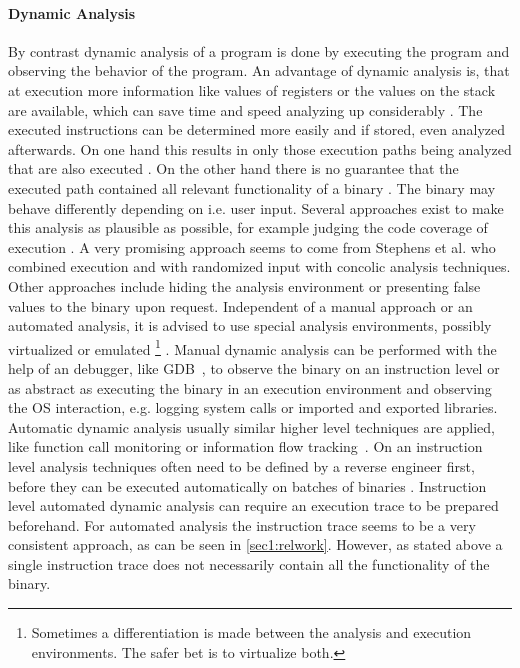 \documentclass[10pt,twoside,a4paper,bibliography=totoc]{scrbook}
\begin{document}
\paragraph*{Dynamic Analysis}
By contrast dynamic analysis of a program is done by executing the program and observing the behavior of the program.
An advantage of dynamic analysis is, that at execution more information 
like values of registers or the values on the stack are available, which
can save time and speed analyzing up considerably \cite{eilam}. 
The executed instructions can be determined more easily and if stored, even analyzed afterwards.
On one hand this results in only those execution paths being analyzed that are also executed \cite{eilam}.
On the other hand there is no guarantee that the executed path contained all relevant functionality of a binary \cite{stephens2016driller}. The binary may behave differently depending on i.e. user input. 
Several approaches exist to make this analysis as plausible as possible, for example judging the code coverage of execution \cite{stephens2016driller}. 
A very promising approach seems to come from Stephens et al. who combined execution and with randomized input with concolic analysis techniques.
Other approaches include hiding the analysis environment or presenting false values to the binary upon request.
Independent of a manual approach or an automated analysis, it is advised to use special analysis environments, possibly virtualized or emulated \footnote{Sometimes a differentiation is made between the analysis and execution environments. The safer bet is to virtualize both.} \cite{DEFCON17:QuLi}.
Manual dynamic analysis can be performed with the help of an debugger, like GDB~\cite{gdb}, to observe the binary on an instruction level or as abstract as executing the binary in an execution environment and observing the OS interaction, e.g. logging system calls or imported and exported libraries. 
Automatic dynamic analysis usually similar higher level techniques are applied, like function call monitoring or information flow tracking~\cite{dynsurvey}. On an instruction level analysis techniques often need to be defined by a reverse engineer first, before they can be executed automatically on batches of binaries \cite{DBLP:conf/sp/SharifLGL09}\cite{Rolles:2009:UVO:1855876.1855877}\cite{Coogan:2011:DVS:2046707.2046739}\cite{DBLP:conf/sp/YadegariJWD15}.
Instruction level automated dynamic analysis can require an execution trace to be prepared beforehand.
For automated analysis the instruction trace seems to be a very consistent approach, as can be seen in \ref{sec1:relwork}. However, as stated above a single instruction trace does not necessarily contain all the functionality of the binary.
\end{document}
